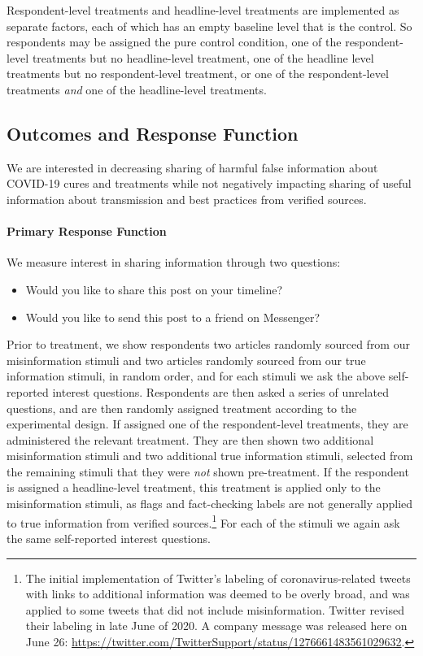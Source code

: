 \documentclass[letterpaper, 12pt, parskip=full,]{scrartcl}
\begin{document}
Respondent-level treatments and headline-level treatments are implemented as separate factors, each of which has an empty baseline level that is the control. So respondents may be assigned the pure control condition, one of the respondent-level treatments but no headline-level treatment, one of the headline level treatments but no respondent-level treatment, or one of the respondent-level treatments \textit{and} one of the headline-level treatments. 


\subsection{Outcomes and Response Function}

We are interested in decreasing sharing of harmful false information about COVID-19 cures and treatments while not negatively impacting sharing of useful information about transmission and best practices from verified sources. 

\paragraph{Primary Response Function}

We measure interest in sharing information through two questions:
\begin{itemize}
\item Would you like to share this post on your timeline? 
\item Would you like to send this post to a friend on Messenger?
\end{itemize}

Prior to treatment, we show respondents two articles randomly sourced from our misinformation stimuli and two articles randomly sourced from our true information stimuli, in random order, and for each stimuli we ask the above self-reported interest questions. Respondents are then asked a series of unrelated questions, and are then randomly assigned treatment according to the experimental design. If assigned one of the respondent-level treatments, they are administered the relevant treatment. They are then shown two additional misinformation stimuli and two additional true information stimuli, selected from the remaining stimuli that they were \textit{not} shown pre-treatment. If the respondent is assigned a headline-level treatment, this treatment is applied only to the misinformation stimuli, as flags and fact-checking labels are not generally applied to true information from verified sources.\footnote{The initial implementation of Twitter's labeling of coronavirus-related tweets with links to additional information was deemed to be overly broad, and was applied to some tweets that did not include misinformation. Twitter revised their labeling in late June of 2020. A company message was released here on June 26: \url{https://twitter.com/TwitterSupport/status/1276661483561029632}. } For each of the stimuli we again ask the same self-reported interest questions. 
\end{document}

